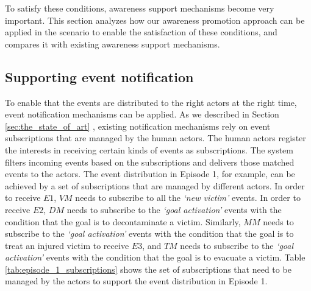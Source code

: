 To satisfy these conditions, awareness support mechanisms become very important. This section analyzes how our awareness promotion approach can be applied in the scenario to enable the satisfaction of these conditions, and compares it with existing awareness support mechanisms.

\subsection{Supporting event notification} %
\label{sub:supporting_event_notification}
To enable that the events are distributed to the right actors at the right time, event notification mechanisms can be applied. As we described in Section \ref{sec:the_state_of_art}  , existing notification mechanisms rely on event subscriptions that are managed by the human actors. The human actors register the interests in receiving certain kinds of events as subscriptions. The system filters incoming events based on the subscriptions and delivers those matched events to the actors. The event distribution in Episode 1, for example, can be achieved by a set of subscriptions that are managed by different actors. In order to receive $E1$, $VM$ needs to subscribe to all the \emph{`new victim'} events. In order to receive $E2$, $DM$ needs to subscribe to the \emph{`goal activation'} events with the condition that the goal is to decontaminate a victim. Similarly, $MM$ needs to subscribe to the \emph{`goal activation'} events with the condition that the goal is to treat an injured victim to receive $E3$, and $TM$ needs to subscribe to the \emph{`goal activation'} events with the condition that the goal is to evacuate a victim. Table \ref{tab:episode_1_subscriptions} shows the set of subscriptions that need to be managed by the actors to support the event distribution in Episode 1.

